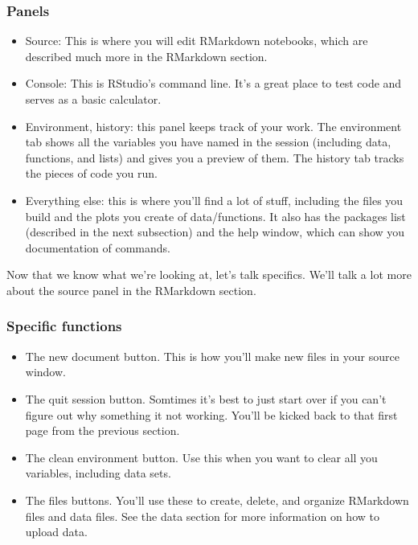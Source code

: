 \documentclass[
]{book}
\providecommand{\tightlist}{%
  \setlength{\itemsep}{0pt}\setlength{\parskip}{0pt}}
\begin{document}
\hypertarget{panels}{%
\subsubsection{Panels}\label{panels}}

\begin{itemize}
\tightlist
\item
  Source: This is where you will edit RMarkdown notebooks, which are described much more in the RMarkdown section.
\item
  Console: This is RStudio's command line. It's a great place to test code and serves as a basic calculator.
\item
  Environment, history: this panel keeps track of your work. The environment tab shows all the variables you have named in the session (including data, functions, and lists) and gives you a preview of them. The history tab tracks the pieces of code you run.
\item
  Everything else: this is where you'll find a lot of stuff, including the files you build and the plots you create of data/functions. It also has the packages list (described in the next subsection) and the help window, which can show you documentation of commands.
\end{itemize}

Now that we know what we're looking at, let's talk specifics. We'll talk a lot more about the source panel in the RMarkdown section.

\hypertarget{specific-functions}{%
\subsubsection{Specific functions}\label{specific-functions}}

\begin{itemize}
\tightlist
\item
  The new document button. This is how you'll make new files in your source window.
\item
  The quit session button. Somtimes it's best to just start over if you can't figure out why something it not working. You'll be kicked back to that first page from the previous section.
\item
  The clean environment button. Use this when you want to clear all you variables, including data sets.
\item
  The files buttons. You'll use these to create, delete, and organize RMarkdown files and data files. See the data section for more information on how to upload data.
\end{itemize}
\end{document}
